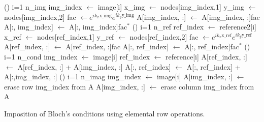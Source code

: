 \begin{algorithm}[h] 
\DontPrintSemicolon
{}
\BlankLine
\For(){ i=1 \KwTo n\_img}{
   img\_index $\leftarrow$ image[i]\;
   x\_img $\leftarrow$ nodes[img\_index,1]\;
   y\_img $\leftarrow$ nodes[img\_index,2]\;
   fac $\leftarrow e^{i k_x \text{x\_img}}e^{i k_y \text{y\_img}}$\;
   A[img\_index, :] $\leftarrow$ A[img\_index, :]fac\;
   A[:, img\_index] $\leftarrow$ A[:, img\_index]fac$^{*}$\;
}
\For(){ i=1 \KwTo n\_ref}{
   ref\_index $\leftarrow$ reference2[i]\;
   x\_ref $\leftarrow$ nodes[ref\_index,1]\;
   y\_ref $\leftarrow$ nodes[ref\_index,2]\;
   fac $\leftarrow e^{i k_x \text{x\_ref}}e^{i k_y \text{y\_ref}}$\;
   A[ref\_index, :] $\leftarrow$ A[ref\_index, :]fac\;
   A[:, ref\_index] $\leftarrow$ A[:, ref\_index]fac$^{*}$\;
}
\For(){ i=1 \KwTo n\_cond}{
   img\_index $\leftarrow$ image[i]\;
   ref\_index $\leftarrow$ reference[i]\;
   A[ref\_index, :] $\leftarrow$ A[ref\_index, :] + A[img\_index, :]\;
   A[:, ref\_index] $\leftarrow$ A[:, ref\_index] + A[:,img\_index, :]\;
}
\For(){ i=1 \KwTo n\_imag}{
   img\_index $\leftarrow$ image[i]\;
   A[img\_index, :] $\leftarrow$ erase row img\_index from A\;
   A[img\_index, :] $\leftarrow$ erase column img\_index from A\;
}
\caption{Imposition of Bloch's conditions using elemental row operations.}\label{algo:bloch_op}
\end{algorithm}

